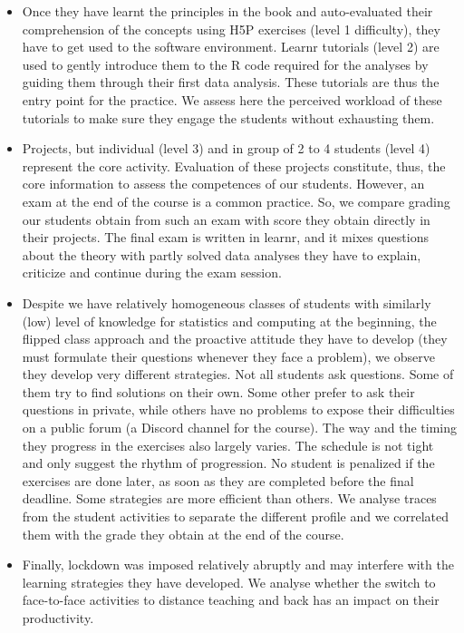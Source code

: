 \documentclass[
]{article}
\begin{document}
\begin{itemize}
\item
  Once they have learnt the principles in the book and auto-evaluated
  their comprehension of the concepts using H5P exercises (level 1
  difficulty), they have to get used to the software environment. Learnr
  tutorials (level 2) are used to gently introduce them to the R code
  required for the analyses by guiding them through their first data
  analysis. These tutorials are thus the entry point for the practice.
  We assess here the perceived workload of these tutorials to make sure
  they engage the students without exhausting them.
\item
  Projects, but individual (level 3) and in group of 2 to 4 students
  (level 4) represent the core activity. Evaluation of these projects
  constitute, thus, the core information to assess the competences of
  our students. However, an exam at the end of the course is a common
  practice. So, we compare grading our students obtain from such an exam
  with score they obtain directly in their projects. The final exam is
  written in learnr, and it mixes questions about the theory with partly
  solved data analyses they have to explain, criticize and continue
  during the exam session.
\item
  Despite we have relatively homogeneous classes of students with
  similarly (low) level of knowledge for statistics and computing at the
  beginning, the flipped class approach and the proactive attitude they
  have to develop (they must formulate their questions whenever they
  face a problem), we observe they develop very different strategies.
  Not all students ask questions. Some of them try to find solutions on
  their own. Some other prefer to ask their questions in private, while
  others have no problems to expose their difficulties on a public forum
  (a Discord channel for the course). The way and the timing they
  progress in the exercises also largely varies. The schedule is not
  tight and only suggest the rhythm of progression. No student is
  penalized if the exercises are done later, as soon as they are
  completed before the final deadline. Some strategies are more
  efficient than others. We analyse traces from the student activities
  to separate the different profile and we correlated them with the
  grade they obtain at the end of the course.
\item
  Finally, lockdown was imposed relatively abruptly and may interfere
  with the learning strategies they have developed. We analyse whether
  the switch to face-to-face activities to distance teaching and back
  has an impact on their productivity.
\end{itemize}
\end{document}
